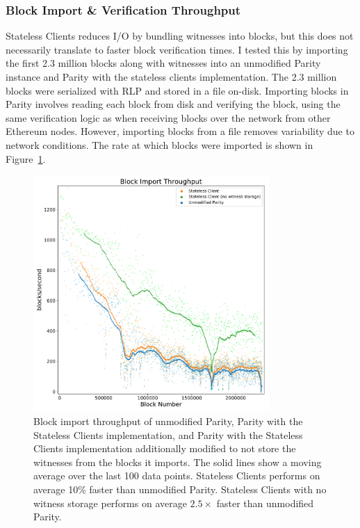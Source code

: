 \documentclass[12pt]{article}
\newcommand{\system}{stateless clients\xspace}
\newcommand{\System}{Stateless Clients\xspace}
\newcommand{\figurewidth}{0.8\textwidth}
\begin{document}
\subsubsection{Block Import \& Verification Throughput} \label{subsubsection:verificationtime}

\System reduces I/O by bundling witnesses into blocks, but this does not necessarily translate to faster block verification times. I tested this by importing the first 2.3 million blocks along with witnesses into an unmodified Parity instance and Parity with the \system implementation. The 2.3 million blocks were serialized with RLP and stored in a file on-disk. Importing blocks in Parity involves reading each block from disk and verifying the block, using the same verification logic as when receiving blocks over the network from other Ethereum nodes. However, importing blocks from a file removes variability due to network conditions. The rate at which blocks were imported is shown in Figure~\ref{fig:throughput}.

\begin{figure}[H]
  \centering
  \includegraphics[width=\figurewidth]{../figures/results/graphs/background/throughput.pdf}
  \caption{Block import throughput of unmodified Parity, Parity with the \System implementation, and Parity with the \System implementation additionally modified to not store the witnesses from the blocks it imports. The solid lines show a moving average over the last 100 data points. \System performs on average 10\% faster than unmodified Parity. \System with no witness storage performs on average $2.5\times$ faster than unmodified Parity.}
  \label{fig:throughput}
\end{figure}
\end{document}
